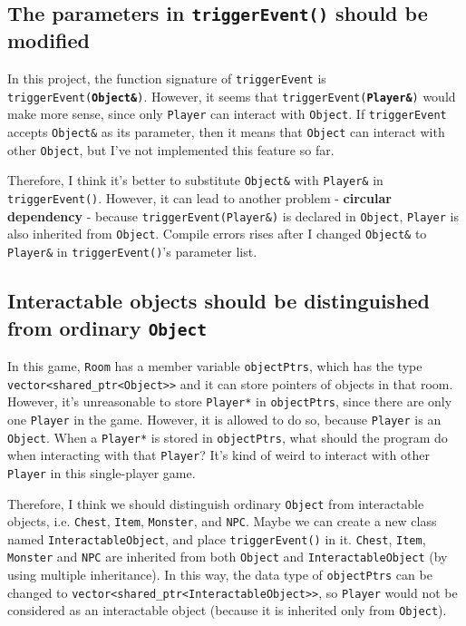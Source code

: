 \documentclass{article}
\begin{document}
    \subsection{The parameters in \texttt{triggerEvent()} should be modified}
    In this project, the function signature of \texttt{triggerEvent} is \texttt{triggerEvent(\textbf{Object\&})}. However, it seems that \texttt{triggerEvent(\textbf{Player\&})} would make more sense, since only \texttt{Player} can interact with \texttt{Object}. If \texttt{triggerEvent} accepts \texttt{Object\&} as its parameter, then it means that \texttt{Object} can interact with other \texttt{Object}, but I've not implemented this feature so far.
    \par
    Therefore, I think it's better to substitute \texttt{Object\&} with \texttt{Player\&} in \texttt{triggerEvent()}. However, it can lead to another problem - \textbf{circular dependency} - because \texttt{triggerEvent(Player\&)} is declared in \texttt{Object}, \texttt{Player} is also inherited from \texttt{Object}. Compile errors rises after I changed \texttt{Object\&} to \texttt{Player\&} in \texttt{triggerEvent()}'s parameter list.
    
    \subsection{Interactable objects should be distinguished from ordinary \texttt{Object}}
    In this game, \texttt{Room} has a member variable \texttt{objectPtrs}, which has the type \texttt{vector<shared\_ptr<Object>>} and it can store pointers of objects in that room. However, it's unreasonable to store \texttt{Player*} in \texttt{objectPtrs}, since there are only one \texttt{Player} in the game. However, it is allowed to do so, because \texttt{Player} is an \texttt{Object}. When a \texttt{Player*} is stored in \texttt{objectPtrs}, what should the program do when interacting with that \texttt{Player}? It's kind of weird to interact with other \texttt{Player} in this single-player game.
    \par
    Therefore, I think we should distinguish ordinary \texttt{Object} from interactable objects, i.e. \texttt{Chest}, \texttt{Item}, \texttt{Monster}, and \texttt{NPC}. Maybe we can create a new class named \texttt{InteractableObject}, and place \texttt{triggerEvent()} in it. \texttt{Chest}, \texttt{Item}, \texttt{Monster} and \texttt{NPC} are inherited from both \texttt{Object} and \texttt{InteractableObject} (by using multiple inheritance). In this way, the data type of \texttt{objectPtrs} can be changed to \texttt{vector<shared\_ptr<InteractableObject>>}, so \texttt{Player} would not be considered as an interactable object (because it is inherited only from \texttt{Object}).
\end{document}
